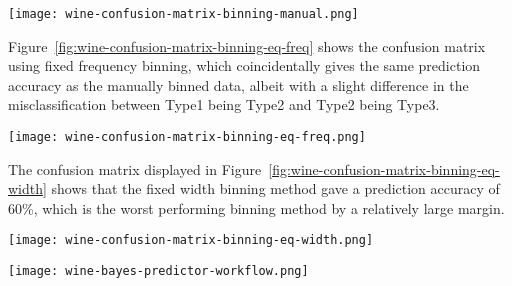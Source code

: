 \documentclass[
  coursecode={CISC/CMPE 251},
  assignmentname={Exercise 2},
  studentnumber=20053722,
  name={Bryan Hoang}
]{
  ltxanswer%
}
\begin{document}
\begin{questions}
\begin{solution}
      \begin{answerfigure}
        \texttt{[image: wine-confusion-matrix-binning-manual.png]}
        \label{fig:wine-confusion-matrix-binning-manual}
      \end{answerfigure}

      Figure~\ref{fig:wine-confusion-matrix-binning-eq-freq} shows the confusion matrix using fixed frequency binning, which coincidentally gives the same prediction accuracy as the manually binned data, albeit with a slight difference in the misclassification between Type1 being Type2 and Type2 being Type3.

      \begin{answerfigure}
        \texttt{[image: wine-confusion-matrix-binning-eq-freq.png]}
        \label{fig:wine-confusion-matrix-binning-eq-freq}
      \end{answerfigure}

      The confusion matrix displayed in Figure~\ref{fig:wine-confusion-matrix-binning-eq-width} shows that the fixed width binning method gave a prediction accuracy of \textapprox{}60\%, which is the worst performing binning method by a relatively large margin.

      \newpage

      \begin{answerfigure}
        \texttt{[image: wine-confusion-matrix-binning-eq-width.png]}
        \label{fig:wine-confusion-matrix-binning-eq-width}
      \end{answerfigure}

      \newpage

      \begin{answerfigure}
        \texttt{[image: wine-bayes-predictor-workflow.png]}
        \label{fig:wine-workflow}
      \end{answerfigure}
    \end{solution}
  \end{questions}
\end{document}
